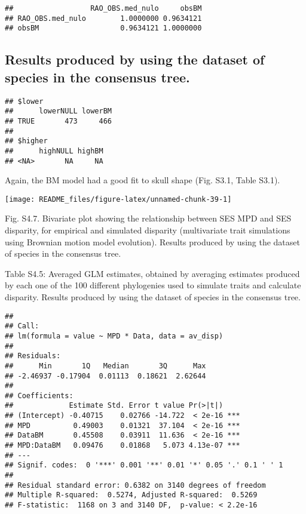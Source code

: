 \documentclass[
]{article}
\begin{document}
\begin{verbatim}
##                  RAO_OBS.med_nulo     obsBM
## RAO_OBS.med_nulo        1.0000000 0.9634121
## obsBM                   0.9634121 1.0000000
\end{verbatim}

\hypertarget{results-produced-by-using-the-dataset-of-species-in-the-consensus-tree.}{%
\subsection{Results produced by using the dataset of species in the
consensus
tree.}\label{results-produced-by-using-the-dataset-of-species-in-the-consensus-tree.}}

\begin{verbatim}
## $lower
##      lowerNULL lowerBM
## TRUE       473     466
## 
## $higher
##      highNULL highBM
## <NA>       NA     NA
\end{verbatim}

Again, the BM model had a good fit to skull shape (Fig. S3.1, Table
S3.1).

\begin{center}\texttt{[image: README\_files/figure-latex/unnamed-chunk-39-1]} \end{center}

Fig. S4.7. Bivariate plot showing the relationship between SES MPD and
SES disparity, for empirical and simulated disparity (multivariate trait
simulations using Brownian motion model evolution). Results produced by
using the dataset of species in the consensus tree.

Table S4.5: Averaged GLM estimates, obtained by averaging estimates
produced by each one of the 100 different phylogenies used to simulate
traits and calculate disparity. Results produced by using the dataset of
species in the consensus tree.

\begin{verbatim}
## 
## Call:
## lm(formula = value ~ MPD * Data, data = av_disp)
## 
## Residuals:
##      Min       1Q   Median       3Q      Max 
## -2.46937 -0.17904  0.01113  0.18621  2.62644 
## 
## Coefficients:
##             Estimate Std. Error t value Pr(>|t|)    
## (Intercept) -0.40715    0.02766 -14.722  < 2e-16 ***
## MPD          0.49003    0.01321  37.104  < 2e-16 ***
## DataBM       0.45508    0.03911  11.636  < 2e-16 ***
## MPD:DataBM   0.09476    0.01868   5.073 4.13e-07 ***
## ---
## Signif. codes:  0 '***' 0.001 '**' 0.01 '*' 0.05 '.' 0.1 ' ' 1
## 
## Residual standard error: 0.6382 on 3140 degrees of freedom
## Multiple R-squared:  0.5274, Adjusted R-squared:  0.5269 
## F-statistic:  1168 on 3 and 3140 DF,  p-value: < 2.2e-16
\end{verbatim}
\end{document}
